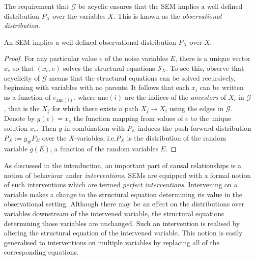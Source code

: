 The requirement that $\mathcal{G}$ be acyclic ensures that the SEM implies a well defined distribution $P_X$ over the variables $X$. This is known as the \emph{observational distribution}.

\medskip

\begin{lemma}\label{lemma:acyclic-sem-well-defined-obs-dist}
An SEM implies a well-defined observational distribution $P_X$ over $X$.
\end{lemma}

\begin{proof}
For any particular value $e$ of the noise variables $E$, there is a unique vector $x_e$ so that $(x_e, e)$ solves the structural equations $\mathcal{S}_X$. To see this, observe that acyclicity of $\mathcal{G}$ means that the structural equations can be solved recursively, beginning with variables with no parents. It follows that each $x_i$ can be written as a function of $e_{\text{anc}(i)}$, where $\text{anc}(i)$ are the indices of the \emph{ancestors} of $X_i$ in $\mathcal{G}$, that is the $X_j$ for which there exists a path $X_j \to X_i$ using the edges in $\mathcal{G}$. 
Denote by $g(e) = x_e$ the function mapping from values of $e$ to the unique solution $x_e$.
Then $g$ in combination with $P_E$ induces the push-forward distribution $P_X := g_\# P_E$ over the $X$-variables, i.e.\:$P_X$ is the distribution of the random variable $g(E)$, a function of the random variables $E$.
\end{proof}

As discussed in the introduction, an important part of causal relationships is a notion of behaviour under \emph{interventions}. 
SEMs are equipped with a formal notion of such interventions which are termed \emph{perfect interventions}. 
Intervening on a variable makes a change to the structural equation determining its value in the observational setting.
Although there may be an effect on the distributions over variables downstream of the intervened variable, the structural equations determining those variables are unchanged. 
Such an intervention is realised by altering the structural equation of the intervened variable. This notion is easily generalised to interventions on multiple variables by replacing all of the corresponding equations. 

